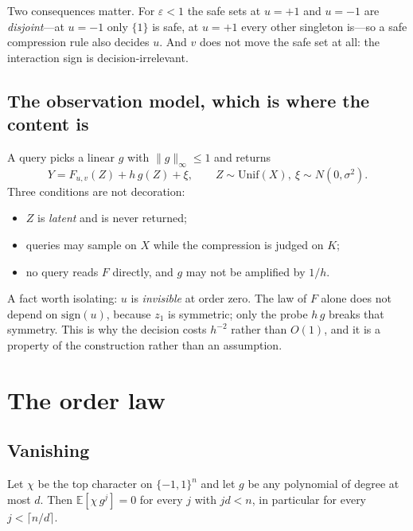Two consequences matter. For $\varepsilon<1$ the safe sets at $u=+1$ and $u=-1$ are
\emph{disjoint}---at $u=-1$ only $\{1\}$ is safe, at $u=+1$ every other singleton is---so a
safe compression rule also decides $u$. And $v$ does not move the safe set at all: the
interaction sign is decision-irrelevant.

\subsection{The observation model, which is where the content is}

A query picks a linear $g$ with $\|g\|_{\infty}\le1$ and returns
\begin{equation}
Y=F_{u,v}(Z)+h\,g(Z)+\xi,\qquad Z\sim\mathrm{Unif}(X),\ \xi\sim N(0,\sigma^{2}).
\label{eq:obs}
\end{equation}
Three conditions are not decoration:
\begin{itemize}
\item $Z$ is \emph{latent} and is never returned;
\item queries may sample on $X$ while the compression is judged on $K$;
\item no query reads $F$ directly, and $g$ may not be amplified by $1/h$.
\end{itemize}


A fact worth isolating: $u$ is \emph{invisible} at order zero. The law of $F$ alone does not
depend on $\mathrm{sign}(u)$, because $z_{1}$ is symmetric; only the probe $h\,g$ breaks that
symmetry. This is why the decision costs $h^{-2}$ rather than $O(1)$, and it is a property of
the construction rather than an assumption. \CERT{}

\section{The order law}
\label{sec:order}

\subsection{Vanishing}

\begin{theorem}
\label{thm:vanish}
Let $\chi$ be the top character on $\{-1,1\}^{n}$ and let $g$ be any polynomial of degree at
most $d$. Then $\mathbb{E}[\chi\,g^{j}]=0$ for every $j$ with $jd<n$, in particular for every
$j<\lceil n/d\rceil$.
\end{theorem}

